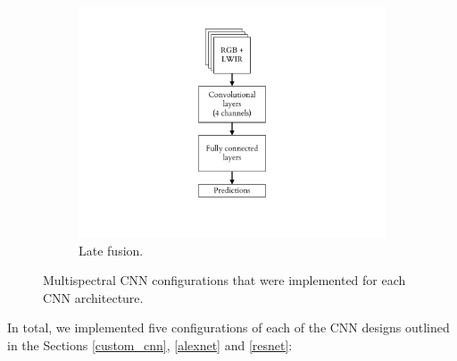 \documentclass{l4proj}
\begin{document}
\begin{figure}[ht]
\begin{subfigure}[h!]{0.3\textwidth}
    \includegraphics[width=\textwidth, page={3}, trim={6.5cm 2.2cm 6.5cm 1.5cm}, clip]{images/models/archs}
    \caption{Late fusion.}
    \label{fig:arch_fusion}
  \end{subfigure}
  \caption{Multispectral CNN configurations that were implemented for each CNN architecture.}
  \label{fig:archs}
\end{figure}

In total, we implemented five configurations of each of the CNN designs outlined in the Sections \ref{custom_cnn}, \ref{alexnet} and \ref{resnet}:
\end{document}
